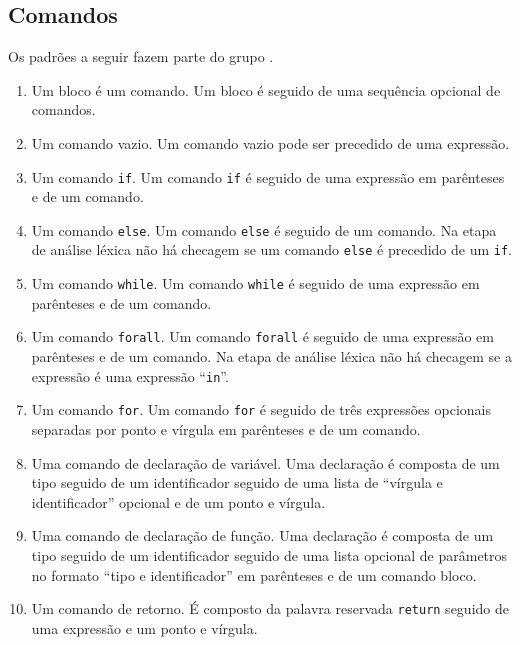 \documentclass{llncs}
\begin{document}
\subsection{Comandos}
Os padrões a seguir fazem parte do grupo .
\begin{enumerate}
	\item {}

		Um bloco é um comando. Um bloco é seguido de uma sequência opcional de comandos.
	\item {}

		Um comando vazio. Um comando vazio pode ser precedido de uma expressão.
	\item {}

		Um comando \texttt{if}. Um comando \texttt{if} é seguido de uma expressão em parênteses e de um comando.
	\item {}

		Um comando \texttt{else}. Um comando \texttt{else} é seguido de um comando. Na etapa de análise léxica não há checagem se um comando \texttt{else} é precedido de um \texttt{if}.
	\item {}

		Um comando \texttt{while}. Um comando \texttt{while} é seguido de uma expressão em parênteses e de um comando.
	\item {}

		Um comando \texttt{forall}. Um comando \texttt{forall} é seguido de uma expressão em parênteses e de um comando. Na etapa de análise léxica não há checagem se a expressão é uma expressão ``\texttt{in}''.
	\item {}

		Um comando \texttt{for}. Um comando \texttt{for} é seguido de três expressões opcionais separadas por ponto e vírgula em parênteses e de um comando.
	\item {}

		Uma comando de declaração de variável. Uma declaração é composta de um tipo seguido de um identificador seguido de uma lista de ``vírgula e identificador'' opcional e de um ponto e vírgula.
	\item {}

		Uma comando de declaração de função. Uma declaração é composta de um tipo seguido de um identificador seguido de uma lista opcional de parâmetros no formato ``tipo e identificador'' em parênteses e de um comando bloco.
	\item {}

		Um comando de retorno. É composto da palavra reservada \texttt{return} seguido de uma expressão e um ponto e vírgula.
\end{enumerate}
\end{document}
